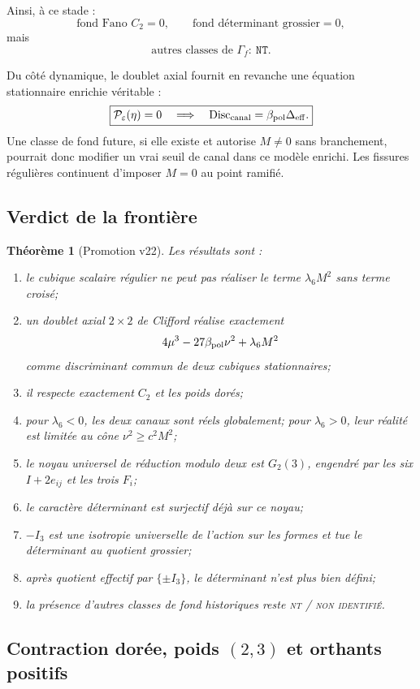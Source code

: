 \documentclass[11pt,a4paper]{article}
\newtheorem{theorem}{Théorème}[section]
\newcommand{\statusNT}{\textsc{nt / non identifié}}
\begin{document}
Ainsi, à ce stade :
\[
\boxed{
\text{fond Fano }C_2=0,
\qquad
\text{fond déterminant grossier}=0,
}
\]
mais
\[
\boxed{
\text{autres classes de }\Gamma_f:
\ \texttt{NT}.}
\]

Du côté dynamique, le doublet axial fournit en revanche une équation stationnaire enrichie véritable :
\[
\boxed{
\mathcal P_\varepsilon(\eta)=0
\quad\Longrightarrow\quad
\operatorname{Disc}_{\rm canal}
=
\beta_{\rm pol}\Delta_{\rm eff}.}
\]
Une classe de fond future, si elle existe et autorise $M\neq0$ sans branchement, pourrait donc modifier un vrai seuil de canal dans ce modèle enrichi. Les fissures régulières continuent d'imposer $M=0$ au point ramifié.

\subsection{Verdict de la frontière}

\begin{theorem}[Promotion v22]\label{thm:v22-verdict}
Les résultats sont :
\begin{enumerate}[label=\textup{(\roman*)}]
\item le cubique scalaire régulier ne peut pas réaliser le terme $\lambda_6M^2$ sans terme croisé;
\item un doublet axial $2\times2$ de Clifford réalise exactement
\[
4\mu^3-27\beta_{\rm pol}\nu^2+\lambda_6M^2
\]
comme discriminant commun de deux cubiques stationnaires;
\item il respecte exactement $C_2$ et les poids dorés;
\item pour $\lambda_6<0$, les deux canaux sont réels globalement; pour $\lambda_6>0$, leur réalité est limitée au cône $\nu^2\ge c^2M^2$;
\item le noyau universel de réduction modulo deux est $G_2(3)$, engendré par les six $I+2e_{ij}$ et les trois $F_i$;
\item le caractère déterminant est surjectif déjà sur ce noyau;
\item $-I_3$ est une isotropie universelle de l'action sur les formes et tue le déterminant au quotient grossier;
\item après quotient effectif par $\{\pm I_3\}$, le déterminant n'est plus bien défini;
\item la présence d'autres classes de fond historiques reste \statusNT{}.
\end{enumerate}
\end{theorem}

\subsection{Contraction dorée, poids $(2,3)$ et orthants positifs}\label{subsec:golden-A2-weights}
\end{document}
